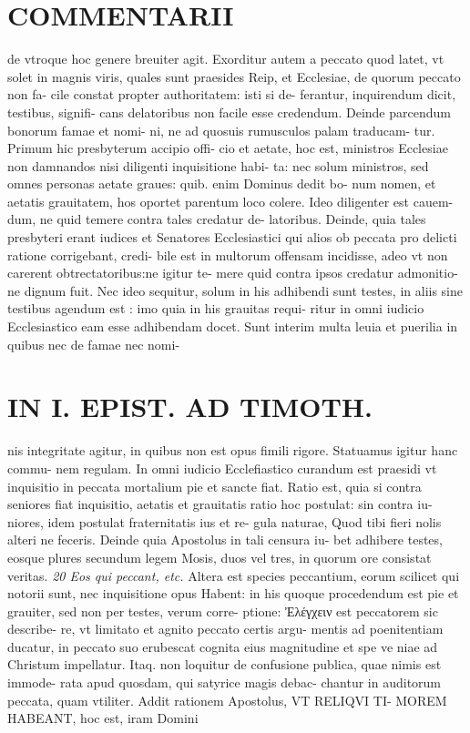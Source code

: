 \documentclass{article}
\begin{document}
\begin{pages}
\section*{COMMENTARII }
\marginpar{[ p.134 ]}\pstart de vtroque hoc genere breuiter agit.  \pend\pstart Exorditur autem a peccato quod latet, vt solet in magnis viris, quales sunt praesides Reip, et Ecclesiae, de quorum peccato non fa- cile constat propter authoritatem: isti si de- ferantur, inquirendum dicit, testibus, signifi- cans delatoribus non facile esse credendum. Deinde parcendum bonorum famae et nomi- ni, ne ad quosuis rumusculos palam traducam- tur. Primum hic presbyterum accipio offi- cio et aetate, hoc est, ministros Ecclesiae non damnandos nisi diligenti inquisitione habi- ta: nec solum ministros, sed omnes personas aetate graues: quib. enim Dominus dedit bo- num nomen, et aetatis grauitatem, hos oportet parentum loco colere. Ideo diligenter est cauem- dum, ne quid temere contra tales credatur de- latoribus. Deinde, quia tales presbyteri erant iudices et Senatores Ecclesiastici qui alios ob peccata pro delicti ratione corrigebant, credi- bile est in multorum offensam incidisse, adeo vt non carerent obtrectatoribus:ne igitur te- mere quid contra ipsos credatur admonitio- ne dignum fuit. Nec ideo sequitur, solum in his adhibendi sunt testes, in aliis sine testibus agendum est : imo quia in his grauitas requi- ritur in omni iudicio Ecclesiastico eam esse adhibendam docet. Sunt interim multa leuia et puerilia in quibus nec de famae nec nomi-  \pend
\section*{IN I. EPIST. AD TIMOTH. }
\marginpar{[ p.135. ]}\pstart nis integritate agitur, in quibus non est opus fimili rigore. Statuamus igitur hanc commu- nem regulam. In omni iudicio Ecclefiastico curandum est praesidi vt inquisitio in peccata mortalium pie et sancte fiat. Ratio est, quia si contra seniores fiat inquisitio, aetatis et grauitatis ratio hoc postulat: sin contra iu- niores, idem postulat fraternitatis ius et re- gula naturae, Quod tibi fieri nolis alteri ne feceris.  \pend\pstart Deinde quia Apostolus in tali censura iu- bet adhibere testes, eosque plures secundum legem Mosis, duos vel tres, in quorum ore consistat veritas.  \pend
\textit{20 Eos qui peccant, etc. }\pstart Altera est species peccantium, eorum scilicet qui notorii sunt, nec inquisitione opus Habent: in his quoque procedendum est pie et grauiter, sed non per testes, verum corre- ptione: Ἐλέγχειν est peccatorem sic describe- re, vt limitato et agnito peccato certis argu- mentis ad poenitentiam ducatur, in peccato suo erubescat cognita eius magnitudine et spe ve niae ad Christum impellatur. Itaq. non loquitur de confusione publica, quae nimis est immode- rata apud quosdam, qui satyrice magis debac- chantur in auditorum peccata, quam vtiliter. Addit rationem Apostolus, VT RELIQVI TI- MOREM HABEANT, hoc est, iram Domini  \pend

\end{pages}
\end{document}
